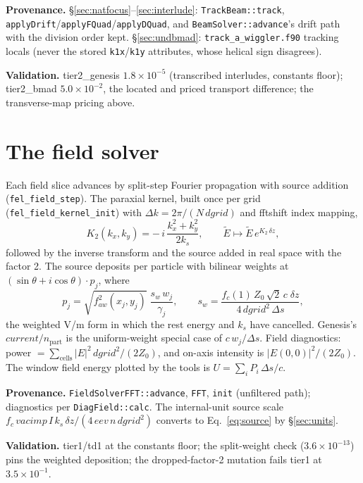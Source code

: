 \documentclass[11pt]{article}
\newcommand{\code}[1]{\texttt{#1}}
\newenvironment{provenance}{\par\small\textbf{Provenance.}}{\par}
\newenvironment{validation}{\par\small\textbf{Validation.}}{\par}
\begin{document}
\begin{provenance}
\S\ref{sec:natfocus}--\ref{sec:interlude}: \code{TrackBeam::track},
\code{applyDrift}/\code{applyFQuad}/\code{applyDQuad}, and \code{BeamSolver::advance}'s
drift path with the division order kept. \S\ref{sec:undbmad}:
\code{track\_a\_wiggler.f90} tracking locals (never the stored \code{k1x}/\code{k1y}
attributes, whose helical sign disagrees).
\end{provenance}
\begin{validation}
tier2\_genesis $1.8\times10^{-5}$ (transcribed interludes, constants floor);
tier2\_bmad $5.0\times10^{-2}$, the located and priced transport difference; the
transverse-map pricing above.
\end{validation}

\section{The field solver}\label{sec:field}

Each field slice advances by split-step Fourier propagation with source addition
(\code{fel\_field\_step}). The paraxial kernel, built once per grid
(\code{fel\_field\_kernel\_init}) with $\Delta k = 2\pi/(N\,\mathit{dgrid})$ and
fftshift index mapping,
\begin{equation}\label{eq:k2}
  K_2(k_x,k_y) = -\,i\,\frac{k_x^2 + k_y^2}{2 k_s}, \qquad
  \tilde E \mapsto \tilde E\, e^{K_2\,\delta z},
\end{equation}
followed by the inverse transform and the source added in real space with the factor
2. The source deposits per particle with bilinear weights at
$(\sin\theta + i\cos\theta)\cdot p_j$, where
\begin{equation}\label{eq:source}
  p_j = \sqrt{f_{aw}^2(x_j,y_j)}\;\frac{s_w\, w_j}{\gamma_j}, \qquad
  s_w = \frac{f_c(1)\, Z_0\, \sqrt2\, c\;\delta z}{4\,\mathit{dgrid}^2\,\Delta s} ,
\end{equation}
the weighted V/m form in which the rest energy and $k_s$ have cancelled. Genesis's
$\mathit{current}/n_{\mathrm{part}}$ is the uniform-weight special case of
$c\,w_j/\Delta s$. Field diagnostics: power $= \sum_{\mathrm{cells}}|E|^2\,
\mathit{dgrid}^2/(2Z_0)$, and on-axis intensity is $|E(0,0)|^2/(2Z_0)$. The window field
energy plotted by the tools is $U = \sum_i P_i\,\Delta s/c$.

\begin{provenance}
\code{FieldSolverFFT::advance}, \code{FFT}, \code{init} (unfiltered path);
diagnostics per \code{DiagField::calc}. The internal-unit source scale
$f_c\,\mathit{vacimp}\,I\,k_s\,\delta z/(4\,\mathit{eev}\,n\,\mathit{dgrid}^2)$
converts to Eq.~\ref{eq:source} by \S\ref{sec:units}.
\end{provenance}
\begin{validation}
tier1/td1 at the constants floor; the split-weight check ($3.6\times10^{-13}$) pins the
weighted deposition; the dropped-factor-2 mutation fails tier1 at $3.5\times10^{-1}$.
\end{validation}
\end{document}

